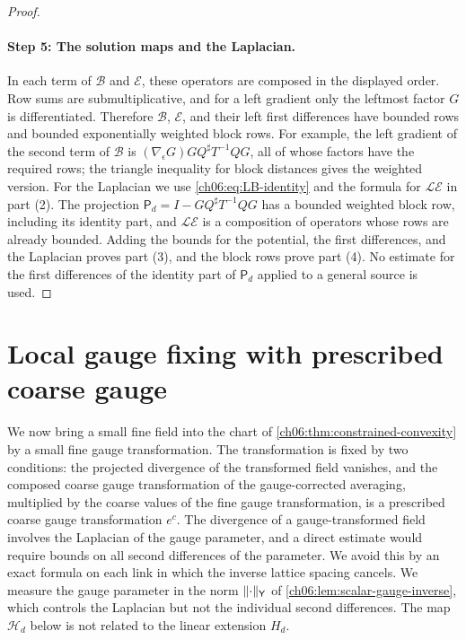 \begin{proof}
\paragraph{Step 5: The solution maps and the Laplacian.}
In each term of $\mathscr B$ and $\mathscr E$, these operators are composed in the displayed order. Row sums are submultiplicative, and for a left gradient only the leftmost factor $G$ is differentiated. Therefore $\mathscr B$, $\mathscr E$, and their left first differences have bounded rows and bounded exponentially weighted block rows. For example, the left gradient of the second term of $\mathscr B$ is $(\nabla_\epsilon G)GQ^\sharp T^{-1}QG$, all of whose factors have the required rows; the triangle inequality for block distances gives the weighted version. For the Laplacian we use \eqref{ch06:eq:LB-identity} and the formula for $\mathscr L\mathscr E$ in part (2). The projection $\mathsf P_d=I-GQ^\sharp T^{-1}QG$ has a bounded weighted block row, including its identity part, and $\mathscr L\mathscr E$ is a composition of operators whose rows are already bounded. Adding the bounds for the potential, the first differences, and the Laplacian proves part (3), and the block rows prove part (4). No estimate for the first differences of the identity part of $\mathsf P_d$ applied to a general source is used.
\end{proof}

\section{Local gauge fixing with prescribed coarse gauge}\label{ch06:sec:gauge}

We now bring a small fine field into the chart of \cref{ch06:thm:constrained-convexity} by a small fine gauge transformation. The transformation is fixed by two conditions: the projected divergence of the transformed field vanishes, and the composed coarse gauge transformation of the gauge-corrected averaging, multiplied by the coarse values of the fine gauge transformation, is a prescribed coarse gauge transformation $e^c$. The divergence of a gauge-transformed field involves the Laplacian of the gauge parameter, and a direct estimate would require bounds on all second differences of the parameter. We avoid this by an exact formula on each link in which the inverse lattice spacing cancels. We measure the gauge parameter in the norm $\lVert \cdot\rVert_{\mathsf Y}$ of \cref{ch06:lem:scalar-gauge-inverse}, which controls the Laplacian but not the individual second differences. The map $\mathscr H_d$ below is not related to the linear extension $H_d$.

